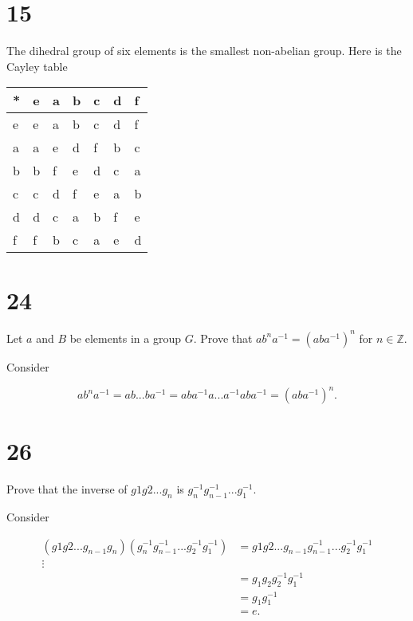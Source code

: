 \documentclass[a4paper]{article}
\begin{document}
\section*{15}

The dihedral group of six elements is the smallest non-abelian group. Here is the Cayley table

\begin{tabular}{ l | l l l l l l }
  * & e & a & b & c & d & f \\
  \hline      
  e & e & a & b & c & d & f \\
  a & a & e & d & f & b & c \\
  b & b & f & e & d & c & a \\
  c & c & d & f & e & a & b \\
  d & d & c & a & b & f & e \\
  f & f & b & c & a & e & d
\end{tabular}


\section*{24}

Let $a$ and $B$ be elements in a group $G$. Prove that $ab^na^{-1} = (aba^{-1})^n$ for $n \in \mathbb{Z}$.

\vspace{\baselineskip}

Consider

$$ab^na^{-1} = a b ... b  a^{-1} = a  b a^{-1} a ... a^{-1} a b a^{-1} = (aba^{-1})^n.$$


\section{}


\section*{26}

Prove that the inverse of $g1 g2 ... g_n$ is $g_n^{-1} g_{n-1}^{-1} ... g_1^{-1}$.

\vspace{\baselineskip}

Consider

\begin{align*}
(g1 g2 ... g_{n-1} g_n) (g_n^{-1} g_{n-1}^{-1} ... g_2^{-1} g_1^{-1}) &= g1 g2 ... g_{n-1} g_{n-1}^{-1} ... g_2^{-1} g_1^{-1} \\
\vdots \\
&= g_1 g_2 g_2^{-1} g_1^{-1} \\
&= g_1 g_1^{-1} \\
&= e.
\end{align*}
\end{document}
